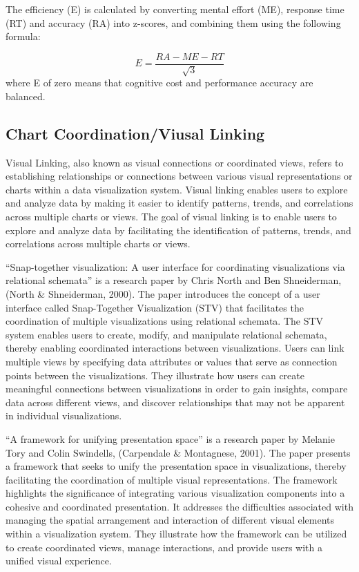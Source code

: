 \documentclass[print]{nuthesis}
\begin{document}
The efficiency (E) is calculated by converting mental effort (ME), response time (RT) and accuracy (RA) into z-scores, and combining them using the following formula:

\[E = \frac{RA - ME - RT}{\sqrt{3}}\]
where E of zero means that cognitive cost and performance accuracy are balanced.

\hypertarget{chart-coordinationviusal-linking}{%
\subsection{Chart Coordination/Viusal Linking}\label{chart-coordinationviusal-linking}}

Visual Linking, also known as visual connections or coordinated views, refers to establishing relationships or connections between various visual representations or charts within a data visualization system.
Visual linking enables users to explore and analyze data by making it easier to identify patterns, trends, and correlations across multiple charts or views.
The goal of visual linking is to enable users to explore and analyze data by facilitating the identification of patterns, trends, and correlations across multiple charts or views.

``Snap-together visualization: A user interface for coordinating visualizations via relational schemata'' is a research paper by Chris North and Ben Shneiderman, (North \& Shneiderman, 2000).
The paper introduces the concept of a user interface called Snap-Together Visualization (STV) that facilitates the coordination of multiple visualizations using relational schemata.
The STV system enables users to create, modify, and manipulate relational schemata, thereby enabling coordinated interactions between visualizations.
Users can link multiple views by specifying data attributes or values that serve as connection points between the visualizations.
They illustrate how users can create meaningful connections between visualizations in order to gain insights, compare data across different views, and discover relationships that may not be apparent in individual visualizations.

``A framework for unifying presentation space'' is a research paper by Melanie Tory and Colin Swindells, (Carpendale \& Montagnese, 2001).
The paper presents a framework that seeks to unify the presentation space in visualizations, thereby facilitating the coordination of multiple visual representations.
The framework highlights the significance of integrating various visualization components into a cohesive and coordinated presentation.
It addresses the difficulties associated with managing the spatial arrangement and interaction of different visual elements within a visualization system.
They illustrate how the framework can be utilized to create coordinated views, manage interactions, and provide users with a unified visual experience.
\end{document}
